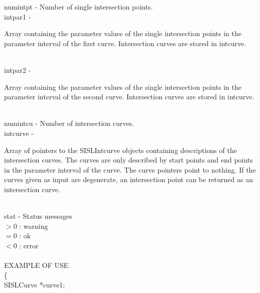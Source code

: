         \>\>    {\fov numintpt}\> - \>  Number of single intersection points.\\
        \>\>    {\fov intpar1}  \> - \> \begin{minipg2}
                        Array containing the parameter values of the
                        single intersection points in the parameter
                        interval of the first curve.
                        Intersection curves are stored in intcurve.
                                \end{minipg2}\\[0.8ex]
        \>\>    {\fov intpar2}  \> - \> \begin{minipg2}
                        Array containing the parameter values of the
                        single intersection points in the parameter
                        interval of the second curve.
                        Intersection curves are stored in intcurve.
                                \end{minipg2}\\[0.8ex]
        \>\>    {\fov numintcu}\> - \>Number of intersection curves.\\
        \>\>    {\fov intcurve}\> - \>  \begin{minipg2}
                        Array of pointers to the SISLIntcurve objects
                        containing descriptions of the intersection
                        curves. The curves are only described by start
                        points and end points in the parameter interval
                        of the curve. The curve pointers point
                        to nothing.
                        If the curves given as input are
                        degenerate, an intersection point can be returned as
                        an intersection curve.
                                \end{minipg2}\\[0.8ex]
        \>\>    {\fov stat}     \> - \> Status messages\\
                \>\>\>\>\>              $> 0$   : warning\\
                \>\>\>\>\>              $= 0$   : ok\\
                \>\>\>\>\>              $< 0$   : error\\
\\ %
EXAMPLE OF USE\\
                \>      \{ \\
                \>\>    SISLCurve       \>      *{\fov curve1};\\
